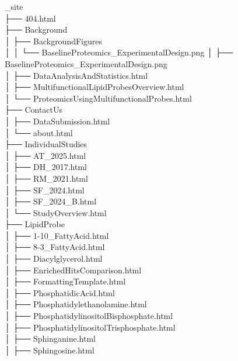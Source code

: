 \documentclass[
  letterpaper,
  DIV=11,
  numbers=noendperiod]{scrartcl}
\begin{document}
\begin{tcolorbox}[enhanced jigsaw, bottomrule=.15mm, opacitybacktitle=0.6, opacityback=0, coltitle=black, colframe=quarto-callout-note-color-frame, breakable, title=\textcolor{quarto-callout-note-color}{\faInfo}\hspace{0.5em}{Note}, colbacktitle=quarto-callout-note-color!10!white, colback=white, leftrule=.75mm, titlerule=0mm, bottomtitle=1mm, toptitle=1mm, arc=.35mm, rightrule=.15mm, left=2mm, toprule=.15mm]

\_site\\
├── 404.html\\
├── Background\\
│ ├── BackgroundFigures\\
│ │ └── BaselineProteomics\_ExperimentalDesign.png │ ├──
BaselineProteomics\_ExperimentalDesign.png\\
│ ├── DataAnalysisAndStatistics.html\\
│ ├── MultifunctionalLipidProbesOverview.html\\
│ └── ProteomicsUsingMultifunctionalProbes.html\\
├── ContactUs\\
│ ├── DataSubmission.html\\
│ └── about.html\\
├── IndividualStudies\\
│ ├── AT\_2025.html\\
│ ├── DH\_2017.html\\
│ ├── RM\_2021.html\\
│ ├── SF\_2024.html\\
│ ├── SF\_2024\_B.html\\
│ └── StudyOverview.html\\
├── LipidProbe\\
│ ├── 1-10\_FattyAcid.html\\
│ ├── 8-3\_FattyAcid.html\\
│ ├── Diacylglycerol.html\\
│ ├── EnrichedHitsComparison.html\\
│ ├── FormattingTemplate.html\\
│ ├── PhosphatidicAcid.html\\
│ ├── Phosphatidylethanolamine.html\\
│ ├── PhosphatidylinositolBisphosphate.html\\
│ ├── PhosphatidylinositolTrisphosphate.html\\
│ ├── Sphinganine.html\\
│ ├── Sphingosine.html\\

\end{tcolorbox}
\end{document}
